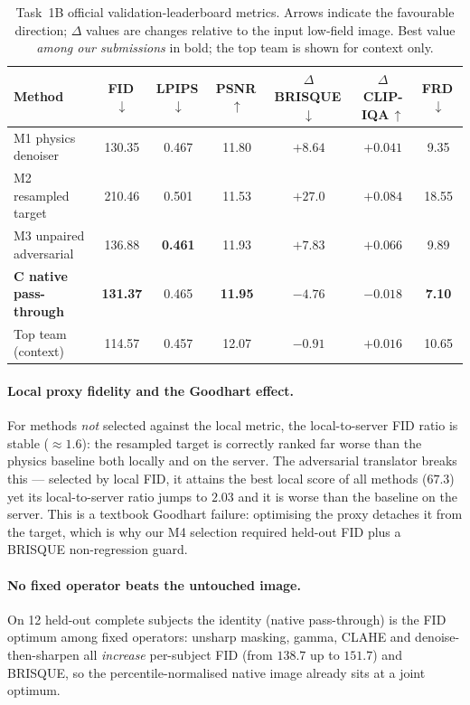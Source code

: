 \documentclass[runningheads]{llncs}
\begin{document}
\begin{table}[htbp]
\caption{Task~1B official validation-leaderboard metrics. Arrows indicate the
favourable direction; $\Delta$ values are changes relative to the input low-field
image. Best value \emph{among our submissions} in bold; the top team is shown for
context only.}
\label{tab:board}
\centering
\small
\begin{tabular}{lcccccc}
\toprule
Method & FID\,$\downarrow$ & LPIPS\,$\downarrow$ & PSNR\,$\uparrow$ &
$\Delta$BRISQUE\,$\downarrow$ & $\Delta$CLIP-IQA\,$\uparrow$ & FRD\,$\downarrow$ \\
\midrule
M1 physics denoiser        & 130.35 & 0.467 & 11.80 & $+8.64$ & $+0.041$ & 9.35 \\
M2 resampled target        & 210.46 & 0.501 & 11.53 & $+27.0$ & $+0.084$ & 18.55 \\
M3 unpaired adversarial    & 136.88 & \textbf{0.461} & 11.93 & $+7.83$ & \textbf{$+0.066$} & 9.89 \\
\textbf{C native pass-through} & \textbf{131.37} & 0.465 & \textbf{11.95} &
\textbf{$-4.76$} & $-0.018$ & \textbf{7.10} \\
\midrule
Top team (context)         & 114.57 & 0.457 & 12.07 & $-0.91$ & $+0.016$ & 10.65 \\
\bottomrule
\end{tabular}
\end{table}

\paragraph{Local proxy fidelity and the Goodhart effect.}
For methods \emph{not} selected against the local metric, the local-to-server FID
ratio is stable ($\approx1.6$): the resampled target is correctly ranked far
worse than the physics baseline both locally and on the server. The adversarial
translator breaks this --- selected by local FID, it attains the best local score
of all methods ($67.3$) yet its local-to-server ratio jumps to $2.03$ and it is
worse than the baseline on the server. This is a textbook Goodhart failure:
optimising the proxy detaches it from the target, which is why our M4 selection
required held-out FID plus a BRISQUE non-regression guard.

\paragraph{No fixed operator beats the untouched image.}
On 12 held-out complete subjects the identity (native pass-through) is the FID
optimum among fixed operators: unsharp masking, gamma, CLAHE and denoise-then-sharpen
all \emph{increase} per-subject FID (from $138.7$ up to $151.7$) and BRISQUE, so the
percentile-normalised native image already sits at a joint optimum.
\end{document}
